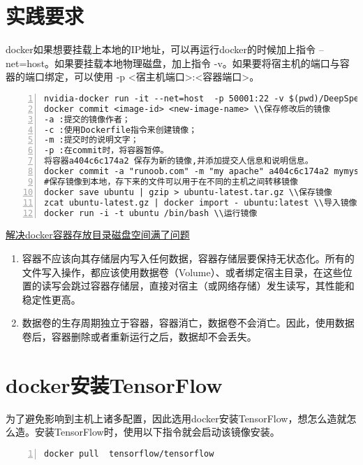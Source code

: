 \section{实践要求}
docker如果想要挂载上本地的IP地址，可以再运行docker的时候加上指令 --net=host。如果要挂载本地物理磁盘，加上指令 -v。如果要将宿主机的端口与容器的端口绑定，可以使用 -p <宿主机端口>:<容器端口>。
\begin{lstlisting}[language = shell, numbers=left, 
		 numberstyle=\tiny,keywordstyle=\color{blue!70},
		 commentstyle=\color{red!50!green!50!blue!50},frame=shadowbox,
		 rulesepcolor=\color{red!20!green!20!blue!20},basicstyle=\ttfamily]
nvidia-docker run -it --net=host  -p 50001:22 -v $(pwd)/DeepSpeech:/DeepSpeech  -v /data1/asr_data:/mnt/data -v /data/kaldi/2019_0521_kaldi/kaldi-master:/mnt/kaldi duhu/ds-server /bin/bash
docker commit <image-id> <new-image-name> \\保存修改后的镜像
-a :提交的镜像作者；
-c :使用Dockerfile指令来创建镜像；
-m :提交时的说明文字；
-p :在commit时，将容器暂停。
将容器a404c6c174a2 保存为新的镜像,并添加提交人信息和说明信息。
docker commit -a "runoob.com" -m "my apache" a404c6c174a2 mymysql:v1
#保存镜像到本地，存下来的文件可以用于在不同的主机之间转移镜像
docker save ubuntu | gzip > ubuntu-latest.tar.gz \\保存镜像
zcat ubuntu-latest.gz | docker import - ubuntu:latest \\导入镜像
docker run -i -t ubuntu /bin/bash \\运行镜像

\end{lstlisting}

\href{https://juejin.im/post/5badee89e51d450e6160312a}{解决docker容器存放目录磁盘空间满了问题
}

\begin{enumerate}
  \item 容器不应该向其存储层内写入任何数据，容器存储层要保持无状态化。所有的文件写入操作，都应该使用数据卷（Volume）、或者绑定宿主目录，在这些位置的读写会跳过容器存储层，直接对宿主（或网络存储）发生读写，其性能和稳定性更高。
  \item 数据卷的生存周期独立于容器，容器消亡，数据卷不会消亡。因此，使用数据卷后，容器删除或者重新运行之后，数据却不会丢失。
\end{enumerate}

\section{docker安装TensorFlow}
为了避免影响到主机上诸多配置，因此选用docker安装TensorFlow，想怎么造就怎么造。安装TensorFlow时，使用以下指令就会启动该镜像安装。
\begin{lstlisting}[language = shell, numbers=left, 
		 numberstyle=\tiny,keywordstyle=\color{blue!70},
		 commentstyle=\color{red!50!green!50!blue!50},frame=shadowbox,
		 rulesepcolor=\color{red!20!green!20!blue!20},basicstyle=\ttfamily]
docker pull  tensorflow/tensorflow
\end{lstlisting}



